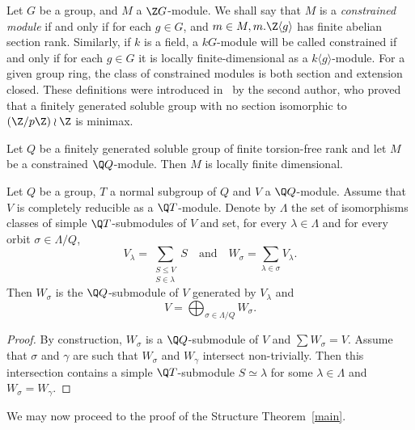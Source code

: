 Let $G$ be a group, and $M$ a $\Z G$-module. We shall say that $M$ is a \emph{constrained module} if and only if for each $g \in G$, and $m \in M, m.\Z\langle g\rangle$ has finite abelian section rank. Similarly, if $k$ is a field, a $kG$-module will be called constrained if and only if for each $g \in G$ it is locally finite-dimensional as a $k\langle g\rangle$-module. For a given group ring, the class of constrained modules is both section and extension closed. These definitions were introduced in~\cite{K84} by the second author, who proved that a finitely generated soluble group with no section isomorphic to $(\Z/p\Z) \wr \Z$ is minimax.

\begin{prop}[{\cite[Lemma~3.3]{K2}}]\label{1985}
Let $Q$ be a finitely generated soluble group of finite torsion-free rank and let $M$ be a constrained $\Q Q$-module. Then $M$ is locally finite dimensional.
\end{prop}


\begin{lemm}\label{lem-direct sum}
Let $Q$ be a group, $T$ a normal subgroup of $Q$ and $V$ a $\Q Q$-module. Assume that $V$ is completely reducible as a $\Q T$-module. Denote by $\Lambda$ the set of isomorphisms classes of simple $\Q T$-submodules of $V$ and set, for every $\lambda \in \Lambda$ and for every orbit $\sigma \in \Lambda/Q$,
\[
V_\lambda = \sum_{\substack{S \leqslant V \\ S\in\lambda}} S \quad\text{and}\quad W_\sigma = \sum_{\lambda \in \sigma} V_\lambda.
\]
Then $W_\sigma$ is the $\Q Q$-submodule of $V$ generated by $V_\lambda$ and
\[
V = \bigoplus_{\sigma \in \Lambda/Q} W_\sigma.
\]
\end{lemm}


\begin{proof}
By construction, $W_\sigma$ is a $\Q Q$-submodule of $V$ and $\sum W_\sigma = V$. Assume that $\sigma $ and $\gamma$ are such that $W_\sigma$ and $W_\gamma$ intersect non-trivially. Then this intersection contains a simple $\Q T$-submodule $S \simeq \lambda$ for some $\lambda \in \Lambda$ and $W_\sigma = W_\gamma$.
\end{proof}


We may now proceed to the proof of the Structure Theorem~\ref{main}.

